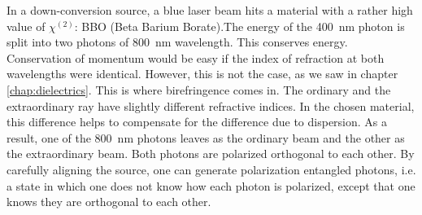 In a down-conversion source, a blue laser beam hits a material with a rather high value of $\chi^{(2)}$: BBO  (Beta Barium Borate).The energy of the 400~nm photon is split into two photons of 800~nm wavelength. This conserves energy. Conservation of momentum would be easy if the index of refraction at both wavelengths were identical. However, this is not the case, as we saw in chapter \ref{chap:dielectrics}. This is where birefringence comes in. The ordinary and the extraordinary ray have slightly different refractive indices. In the chosen material, this difference helps to compensate for the difference due to dispersion. As a result, one of the 800~nm photons leaves as the ordinary beam and the other as the extraordinary beam. Both photons are polarized orthogonal to each other. By carefully aligning the source, one can generate polarization entangled photons, i.e. a state in which one does not know how each photon is polarized, except that one knows they are orthogonal to each other.

\printbibliography[segment=\therefsegment,heading=subbibliography]
